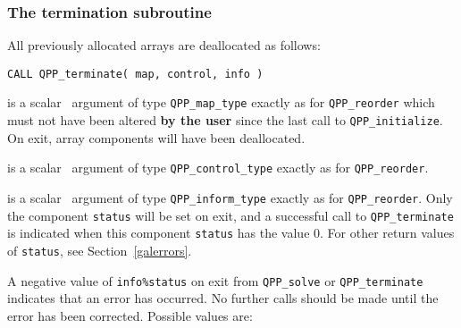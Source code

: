 \documentclass{galahad}
\newcommand{\packagename}{QPP}
\begin{document}

\subsubsection{The  termination subroutine}
All previously allocated arrays are deallocated as follows:
\vspace*{1mm}

\hspace{8mm}
{\tt CALL \packagename\_terminate( map, control, info )}

\vspace*{-3mm}
\begin{description}

 is a scalar \intentinout\ argument of type
{\tt \packagename\_map\_type}
exactly as for
{\tt \packagename\_reorder}
which must not have been altered {\bf by the user} since the last call to
{\tt \packagename\_initialize}.
On exit, array components will have been deallocated.

 is a scalar \intentin\ argument of type
{\tt \packagename\_control\_type}
exactly as for
{\tt \packagename\_reorder}.

 is a scalar \intentout\ argument of type
{\tt \packagename\_inform\_type}
exactly as for
{\tt \packagename\_reorder}.
Only the component {\tt status} will be set on exit, and a
successful call to
{\tt \packagename\_terminate}
is indicated when this  component {\tt status} has the value 0.
For other return values of {\tt status}, see Section~\ref{galerrors}.

\end{description}


\galerrors
A negative value of {\tt info\%status} on exit from
{\tt \packagename\_solve}
or
{\tt \packagename\_terminate}
indicates that an error has occurred. No further calls should be made
until the error has been corrected. Possible values are:
\end{document}
